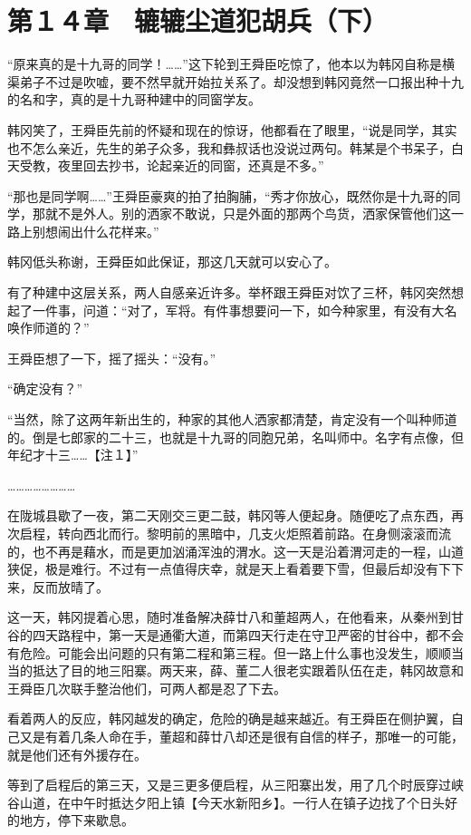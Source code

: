 \section{第１４章　辘辘尘道犯胡兵（下）}

“原来真的是十九哥的同学！……”这下轮到王舜臣吃惊了，他本以为韩冈自称是横渠弟子不过是吹嘘，要不然早就开始拉关系了。却没想到韩冈竟然一口报出种十九的名和字，真的是十九哥种建中的同窗学友。

韩冈笑了，王舜臣先前的怀疑和现在的惊讶，他都看在了眼里，“说是同学，其实也不怎么亲近，先生的弟子众多，我和彝叔话也没说过两句。韩某是个书呆子，白天受教，夜里回去抄书，论起亲近的同窗，还真是不多。”

“那也是同学啊……”王舜臣豪爽的拍了拍胸脯，“秀才你放心，既然你是十九哥的同学，那就不是外人。别的洒家不敢说，只是外面的那两个鸟货，洒家保管他们这一路上别想闹出什么花样来。”

韩冈低头称谢，王舜臣如此保证，那这几天就可以安心了。

有了种建中这层关系，两人自感亲近许多。举杯跟王舜臣对饮了三杯，韩冈突然想起了一件事，问道：“对了，军将。有件事想要问一下，如今种家里，有没有大名唤作师道的？”

王舜臣想了一下，摇了摇头：“没有。”

“确定没有？”

“当然，除了这两年新出生的，种家的其他人洒家都清楚，肯定没有一个叫种师道的。倒是七郎家的二十三，也就是十九哥的同胞兄弟，名叫师中。名字有点像，但年纪才十三……【注１】”

……………………

在陇城县歇了一夜，第二天刚交三更二鼓，韩冈等人便起身。随便吃了点东西，再次启程，转向西北而行。黎明前的黑暗中，几支火炬照着前路。在身侧滚滚而流的，也不再是藉水，而是更加汹涌浑浊的渭水。这一天是沿着渭河走的一程，山道狭促，极是难行。不过有一点值得庆幸，就是天上看着要下雪，但最后却没有下下来，反而放晴了。

这一天，韩冈提着心思，随时准备解决薛廿八和董超两人，在他看来，从秦州到甘谷的四天路程中，第一天是通衢大道，而第四天行走在守卫严密的甘谷中，都不会有危险。可能会出问题的只有第二程和第三程。但一路上什么事也没发生，顺顺当当的抵达了目的地三阳寨。两天来，薛、董二人很老实跟着队伍在走，韩冈故意和王舜臣几次联手整治他们，可两人都是忍了下去。

看着两人的反应，韩冈越发的确定，危险的确是越来越近。有王舜臣在侧护翼，自己又是有着几条人命在手，董超和薛廿八却还是很有自信的样子，那唯一的可能，就是他们还有外援存在。

等到了启程后的第三天，又是三更多便启程，从三阳寨出发，用了几个时辰穿过峡谷山道，在中午时抵达夕阳上镇【今天水新阳乡】。一行人在镇子边找了个日头好的地方，停下来歇息。

